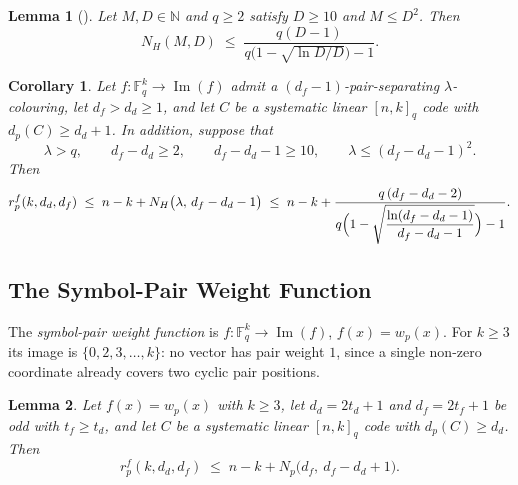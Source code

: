 \documentclass[11pt,draftclsnofoot,journal,onecolumn]{IEEEtran}
\newtheorem{lemma}{Lemma}
\newtheorem{corollary}{Corollary}
\begin{document}
    \begin{lemma}[{\cite[Lem.~10]{singh2025function}}]
\label{lem:nh-asymptotic}
Let $M, D \in \mathbb{N}$ and $q \ge 2$ satisfy $D \ge 10$ and $M \le D^2$. Then
\[
    N_H(M,D) \;\le\; \frac{q(D-1)}{q\bigl(1 - \sqrt{\ln D / D}\bigr) - 1}.
\]
\end{lemma}

        \begin{corollary}
        \label{cor:locally-asymptotic}
        Let $f : \mathbb{F}_q^k \to \operatorname{Im}(f)$ admit a $(d_f-1)$-pair-separating $\lambda$-colouring, let $d_f > d_d \ge 1$, and let $C$ be a systematic linear $[n,k]_q$ code with $d_p(C) \ge d_d + 1$. In addition, suppose that
        \[
            \lambda > q, \qquad d_f - d_d \ge 2, \qquad d_f - d_d - 1 \ge 10,
            \qquad \lambda \le (d_f - d_d - 1)^2 .
        \]
        Then
        \[
            r_p^f(k,d_d,d_f)
            \;\le\; n - k + N_H\bigl(\lambda,\, d_f - d_d - 1\bigr)
            \;\le\; n - k
              + \frac{q\,(d_f - d_d - 2)}
                     {q\Bigl(1 - \sqrt{\dfrac{\ln(d_f - d_d - 1)}{d_f - d_d - 1}}\Bigr) - 1}.
        \]
        \end{corollary}

\subsection{The Symbol-Pair Weight Function}

    The \emph{symbol-pair weight function} is $f : \mathbb{F}_q^{k} \to \operatorname{Im}(f)$, $f(x) = w_p(x)$. For $k \ge 3$ its image is $\{0,2,3,\dots,k\}$: no vector has pair weight $1$, since a single non-zero coordinate already covers two cyclic pair positions.

    \begin{lemma}
    \label{lem:pair-weight-fcc}
    Let $f(x) = w_p(x)$ with $k \ge 3$, let $d_d = 2t_d+1$ and $d_f = 2t_f+1$ be odd with
    $t_f \ge t_d$, and let $C$ be a systematic linear $[n,k]_q$ code with
    $d_p(C) \ge d_d$. Then
    \[
        r_p^f(k,d_d,d_f) \;\le\; n-k+N_p\bigl(d_f,\ d_f-d_d+1\bigr).
    \]
    \end{lemma}
\end{document}
